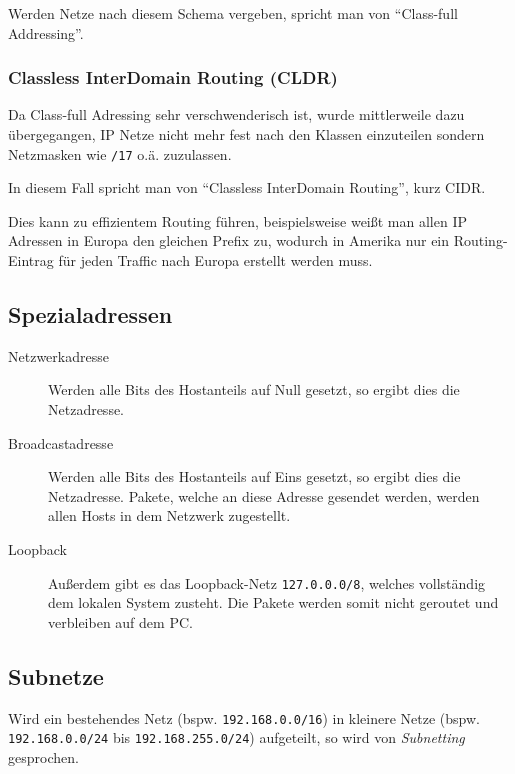 \documentclass[a4paper, 11pt, accentcolor = tud3b]{tudreport}
\begin{document}
	            Werden Netze nach diesem Schema vergeben, spricht man von \enquote{Class-full Addressing}.

                \subsubsection{Classless InterDomain Routing (CLDR)}
	                Da Class-full Adressing sehr verschwenderisch ist, wurde mittlerweile dazu übergegangen, IP Netze nicht mehr fest nach den Klassen einzuteilen sondern Netzmasken wie \texttt{/17} o.ä. zuzulassen.
	                
	                In diesem Fall spricht man von \enquote{Classless InterDomain Routing}, kurz CIDR.
	                
	                Dies kann zu effizientem Routing führen, beispielsweise weißt man allen IP Adressen in Europa den gleichen Prefix zu, wodurch in Amerika nur ein Routing-Eintrag für jeden Traffic nach Europa erstellt werden muss.

            \subsection{Spezialadressen}
                \begin{description}
                	\item[Netzwerkadresse] Werden alle Bits des Hostanteils auf Null gesetzt, so ergibt dies die Netzadresse.
                	\item[Broadcastadresse] Werden alle Bits des Hostanteils auf Eins gesetzt, so ergibt dies die Netzadresse. Pakete, welche an diese Adresse gesendet werden, werden allen Hosts in dem Netzwerk zugestellt.
                	\item[Loopback] Außerdem gibt es das Loopback-Netz \texttt{127.0.0.0/8}, welches vollständig dem lokalen System zusteht. Die Pakete werden somit nicht geroutet und verbleiben auf dem PC.
                \end{description}

            \subsection{Subnetze}
                Wird ein bestehendes Netz (bspw. \texttt{192.168.0.0/16}) in kleinere Netze (bspw. \texttt{192.168.0.0/24} bis \texttt{192.168.255.0/24}) aufgeteilt, so wird von \textit{Subnetting} gesprochen.
                
\end{document}
